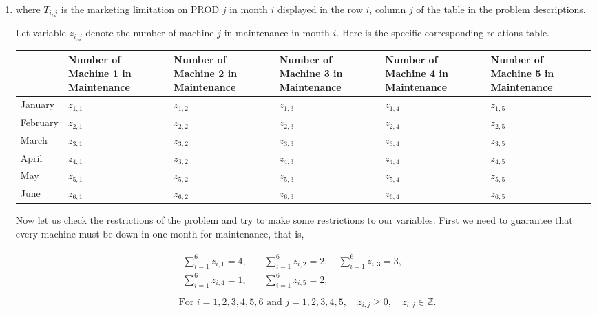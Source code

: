 \documentclass[12pt,a4paper]{article}
\makeatletter
\newtheorem*{solution}{Solution}
\theoremstyle{definition}
\renewenvironment{solution}[1][Solution] {\par\pushQED{\qed}\normalfont\topsep6\p@\@plus6\p@\relax\trivlist\item[\hskip\labelsep\bfseries#1\@addpunct{.}]\ignorespaces}{\popQED\endtrivlist\@endpefalse} \makeatother
\makeatother
\begin{document}
\begin{enumerate}
\begin{solution}
\begin{enumerate}
        where $T_{i,j}$ is the marketing limitation on PROD $j$ in month $i$ displayed in the row $i$, column $j$ of the table in the problem descriptions.

        Let variable $z_{i,j}$ denote the number of machine $j$ in maintenance in month $i$. Here is the specific corresponding relations table.
    	\begin{table}[htbp]
    		\scriptsize
    		\centering
    		\renewcommand\arraystretch{1.1}
    		\begin{tabular}{m{} m{}<{\centering} m{}<{\centering} m{}<{\centering} m{}<{\centering} m{}<{\centering}}
    			\hline
    			& \textbf{Number of Machine 1 in Maintenance} & \textbf{Number of Machine 2 in Maintenance} & \textbf{Number of Machine 3 in Maintenance} & \textbf{Number of Machine 4 in Maintenance} & \textbf{Number of Machine 5 in Maintenance} \\\hline
    			January & $z_{1,1}$ & $z_{1,2}$ & $z_{1,3}$ & $z_{1,4}$ & $z_{1,5}$ \\
    			February & $z_{2,1}$ & $z_{2,2}$ & $z_{2,3}$ & $z_{2,4}$ & $z_{2,5}$ \\
    			March & $z_{3,1}$ & $z_{3,2}$ & $z_{3,3}$ & $z_{3,4}$ & $z_{3,5}$ \\
    			April & $z_{4,1}$ & $z_{3,2}$ & $z_{4,3}$ & $z_{4,4}$ & $z_{4,5}$ \\
    			May & $z_{5,1}$ & $z_{5,2}$ & $z_{5,3}$ & $z_{5,4}$ & $z_{5,5}$ \\
    			June & $z_{6,1}$ & $z_{6,2}$ & $z_{6,3}$ & $z_{6,4}$ & $z_{6,5}$ \\
    			\hline
    		\end{tabular}
    	\end{table}

        Now let us check the restrictions of the problem and try to make some restrictions to our variables. First we need to guarantee that every machine must be down in one month for maintenance, that is,

        \begin{equation}
        \begin{aligned}
        & \begin{aligned}
        \sum_{i = 1}^6 z_{i,1} = 4, & \quad \sum_{i = 1}^6 z_{i,2} = 2, \quad \sum_{i = 1}^6 z_{i,3} = 3, \\
        \sum_{i = 1}^6 z_{i,4} = 1, & \quad \sum_{i = 1}^6 z_{i,5} = 2, \\
        \end{aligned} \\
        & \textrm{For\ } i = 1,2,3,4,5,6 \textrm{\ and\ } j = 1,2,3,4,5, \quad z_{i,j} \geq 0, \quad z_{i,j} \in \mathbb{Z}. \\
        \end{aligned}
        \label{rest4}
        \end{equation}


\end{enumerate}
\end{solution}
\end{enumerate}
\end{document}
